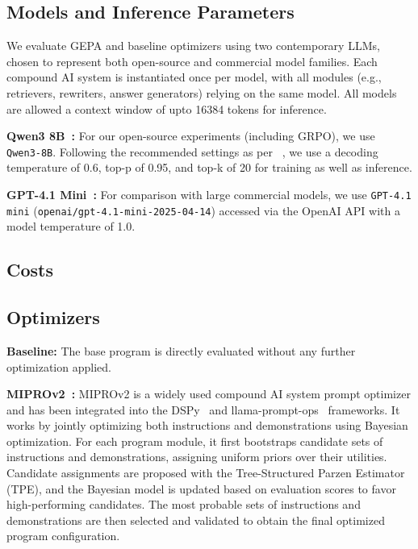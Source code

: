 \documentclass{article} %
\begin{document}
\subsection{Models and Inference Parameters}\label{sec:sec:eval_setup_models}
We evaluate GEPA and baseline optimizers using two contemporary LLMs, chosen to represent both open-source and commercial model families. Each compound AI system is instantiated once per model, with all modules (e.g., retrievers, rewriters, answer generators) relying on the same model. All models are allowed a context window of upto 16384 tokens for inference.


\textbf{Qwen3 8B~\citep{qwen3_technical_report}:} For our open-source experiments (including GRPO), we use \texttt{Qwen3-8B}. Following the recommended settings as per ~\citet{qwen3_8b_hf}, we use a decoding temperature of 0.6, top-p of 0.95, and top-k of 20 for training as well as inference.

\textbf{GPT-4.1 Mini~\citep{gpt_41_model}:} For comparison with large commercial models, we use \texttt{GPT-4.1 mini} (\texttt{openai/gpt-4.1-mini-2025-04-14}) accessed via the OpenAI API with a model temperature of 1.0.

\subsection{Costs} \label{sec:sec:eval_costs}


\subsection{Optimizers}\label{sec:sec:eval_setup_optimizers}
\textbf{Baseline:} The base program is directly evaluated without any further optimization applied.

\textbf{MIPROv2~\citep{miprov2}:} MIPROv2 is a widely used compound AI system prompt optimizer and has been integrated into the DSPy~\citep{dspy} and llama-prompt-ops~\citep{llama_prompt_ops} frameworks. It works by jointly optimizing both instructions and demonstrations using Bayesian optimization. For each program module, it first bootstraps candidate sets of instructions and demonstrations, assigning uniform priors over their utilities. Candidate assignments are proposed with the Tree-Structured Parzen Estimator (TPE), and the Bayesian model is updated based on evaluation scores to favor high-performing candidates. The most probable sets of instructions and demonstrations are then selected and validated to obtain the final optimized program configuration.
\end{document}
